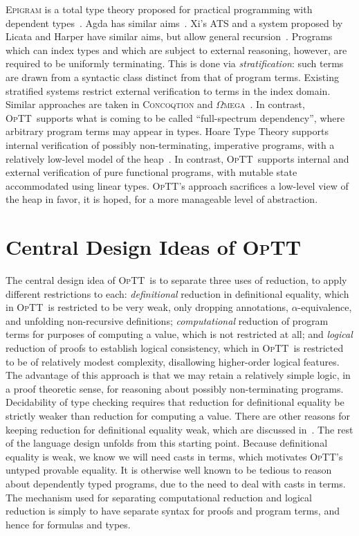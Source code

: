 \documentclass[9pt,natbib]{sigplanconf}
\newcommand{\optt}{\textsc{OpTT}}
\begin{document}
\textsc{Epigram} is a total type theory proposed for practical
programming with dependent types~\cite{mcbride+04}.  Agda has similar
aims~\cite{norell07}.  Xi's \textsc{ATS} and a system proposed by
Licata and Harper have similar aims, but allow general
recursion~\cite{licata+05,chenxi05}.  Programs which can index types
and which are subject to external reasoning, however, are required to
be uniformly terminating.  This is done via \emph{stratification}:
such terms are drawn from a syntactic class distinct from that of
program terms.  Existing stratified systems restrict external
verification to terms in the index domain.  Similar approaches are
taken in \textsc{Concoqtion} and
$\Omega$\textsc{mega}~\cite{pasalic+07,sheard06}.  In contrast, \optt\
supports what is coming to be called ``full-spectrum dependency'',
where arbitrary program terms may appear in types.  Hoare Type Theory
supports internal verification of possibly non-terminating, imperative
programs, with a relatively low-level model of the
heap~\cite{nanevski+05}.  In contrast, \optt\ supports internal and
external verification of pure functional programs, with mutable state
accommodated using linear types.  \optt's approach sacrifices a
low-level view of the heap in favor, it is hoped, for a more
manageable level of abstraction.

\section{Central Design Ideas of \optt}
\label{sec:optt}

The central design idea of \optt\ is to separate three uses of
reduction, to apply different restrictions to each:
\emph{definitional} reduction in definitional equality, which in
\optt\ is restricted to be very weak, only dropping annotations,
$\alpha$-equivalence, and unfolding non-recursive definitions;
\emph{computational} reduction of program terms for purposes of
computing a value, which is not restricted at all; and \emph{logical}
reduction of proofs to establish logical consistency, which in \optt\
is restricted to be of relatively modest complexity, disallowing
higher-order logical features.  The advantage of this approach is that
we may retain a relatively simple logic, in a proof theoretic sense,
for reasoning about possibly non-terminating programs.  Decidability
of type checking requires that reduction for definitional equality be
strictly weaker than reduction for computing a value.  There are other
reasons for keeping reduction for definitional equality weak, which
are discussed in~\cite{optt}.  The rest of the language design unfolds
from this starting point.  Because definitional equality is weak, we
know we will need casts in terms, which motivates \optt's untyped
provable equality.  It is otherwise well known to be tedious to reason
about dependently typed programs, due to the need to deal with casts
in terms.  The mechanism used for separating computational reduction
and logical reduction is simply to have separate syntax for proofs and
program terms, and hence for formulas and types.  
\end{document}
